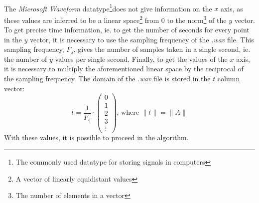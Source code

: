 \documentclass{article}
\providecommand{\norm}[1]{\lVert#1\rVert}
\begin{document}
\paragraph*{}
The \textit{Microsoft Waveform} datatype\footnote{The commonly used datatype for
storing signals in computers}does not give information on the $x$ axis, as these
values are inferred to be a linear space\footnote{A vector of linearly
equidistant values} from $0$ to the norm\footnote{The number of elements in a
vector} of the $y$ vector. To get precise time information, ie. to get the
number of seconds for every point in the $y$ vector, it is necessary to use the
sampling frequency of the \textit{.wav} file. This sampling frequency, $F_s$,
gives the number of samples taken in a single second, ie. the number of $y$
values per single second.  Finally, to get the values of the $x$ axis, it is
necessary to multiply the aforementioned linear space by the reciprocal of the
sampling frequency. The domain of the \textit{.wav} file is stored in the $t$
column vector:
$$t = \frac{1}{F_s} \cdot
\begin{pmatrix}
	0 \\
	1 \\
	2 \\
	3 \\
	\vdots
\end{pmatrix}\text{, where $\norm{t} = \norm{A}$}
$$
With these values, it is possible to proceed in the algorithm.
\end{document}

